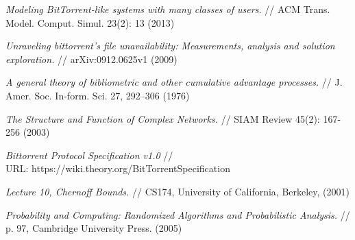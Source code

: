 \documentclass{matmex-diploma-custom}
\theoremstyle{named}
\begin{document}


\newpage

\begin{thebibliography}{XXXX}
	{%
			\renewcommand{\baselinestretch}{1.01}
			\selectfont
			
		{\em Modeling BitTorrent-like systems with many classes of users.}
		// ACM Trans. Model. Comput. Simul. 23(2): 13 (2013)
			
		{\em Unraveling bittorrent's file unavailability: Measurements, analysis and solution exploration.}
		// arXiv:0912.0625v1 (2009)
				
		{\em A general theory of bibliometric and other cumulative advantage processes.} 
		// J. Amer. Soc. In-form. Sci. 27, 292–306 (1976)
	
		{\em The Structure and Function of Complex Networks.}
		// SIAM Review 45(2): 167-256 (2003)

		{\em Bittorrent Protocol Specification v1.0} //
		\\ URL: https://wiki.theory.org/BitTorrentSpecification
		
		{\em Lecture 10, Chernoff Bounds.}
		// CS174, University of California, Berkeley, (2001)
		
		{\em Probability and Computing: Randomized Algorithms and Probabilistic Analysis.}
		// p. 97, Cambridge University Press.  (2005)
		
	}%
\end{thebibliography}
	
\end{document}
